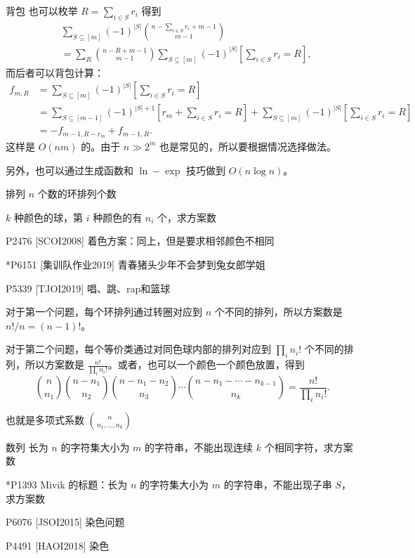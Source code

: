 \begin{frame}{背包}
    也可以枚举 $R=\sum_{i\in S}r_i$ 得到
    $$
    \begin{aligned}
    &\sum_{S\subseteq [m]}(-1)^{|S|}\binom{n-\sum_{i\in S}r_i+m-1}{m-1}\\
    &=\sum_R\binom{n-R+m-1}{m-1}\sum_{S\subseteq [m]}(-1)^{|S|}\left[\sum_{i\in S}r_i=R\right],
    \end{aligned}
    $$
    而后者可以背包计算：
    $$
    \begin{aligned}
    f_{m,R}&=\sum_{S\subseteq [m]}(-1)^{|S|}\left[\sum_{i\in S}r_i=R\right]\\
    &=\sum_{S\subseteq [m-1]}(-1)^{|S|+1}\left[r_m+\sum_{i\in S}r_i=R\right]+ \sum_{S\subseteq [m]}(-1)^{|S|}\left[\sum_{i\in S}r_i=R\right]\\
    &=-f_{m-1,R-r_m}+f_{m-1,R}.
    \end{aligned}
    $$
    这样是 $O(nm)$ 的。由于 $n\gg 2^m$ 也是常见的，所以要根据情况选择做法。

    另外，也可以通过生成函数和 $\ln-\exp$ 技巧做到 $O(n\log n)$。
\end{frame}
\begin{frame}{排列}
    $n$ 个数的环排列个数

    $k$ 种颜色的球，第 $i$ 种颜色的有 $n_i$ 个，求方案数

    P2476 [SCOI2008] 着色方案：同上，但是要求相邻颜色不相同

    *P6151 [集训队作业2019] 青春猪头少年不会梦到兔女郎学姐

    P5339 [TJOI2019] 唱、跳、rap和篮球
\end{frame}
\begin{frame}
    对于第一个问题，每个环排列通过转圈对应到 $n$ 个不同的排列，所以方案数是 $n!/n=(n-1)!$。

    对于第二个问题，每个等价类通过对同色球内部的排列对应到 $\prod_i n_i!$ 个不同的排列，所以方案数是 $\frac{n!}{\prod_i n_i!}$。或者，也可以一个颜色一个颜色放置，得到 
    $$
    \binom{n}{n_1}\binom{n-n_1}{n_2}\binom{n-n_1-n_2}{n_3}\cdots\binom{n-n_1-\cdots-n_{k-1}}{n_k}=\frac{n!}{\prod_i n_i!}.
    $$

    也就是多项式系数 $\binom{n}{n_1,\ldots,n_k}$
\end{frame}
\begin{frame}{数列}
    长为 $n$ 的字符集大小为 $m$ 的字符串，不能出现连续 $k$ 个相同字符，求方案数

    *P1393 Mivik 的标题：长为 $n$ 的字符集大小为 $m$ 的字符串，不能出现子串 $S$，求方案数

    P6076 [JSOI2015] 染色问题

    P4491 [HAOI2018] 染色
\end{frame}
